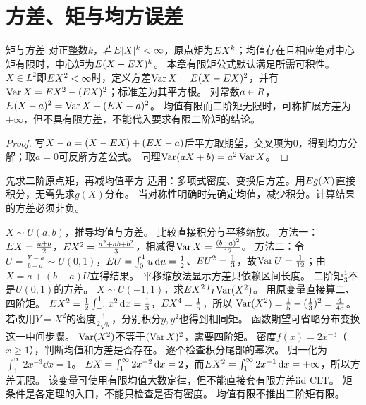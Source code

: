 \section{方差、矩与均方误差}\label{sec:42}
\begin{definition}{矩与方差}
对正整数$k$，若$E|X|^k<\infty$，原点矩为$E X^k$；均值存在且相应绝对中心矩有限时，中心矩为$E(X-E X)^k$。
本章有限矩公式默认满足所需可积性。$X\in L^2$即$E X^2<\infty$时，定义方差$\operatorname{Var} X=E(X-E X)^2$，并有$\operatorname{Var} X=E X^2-(E X)^2$；标准差为其平方根。
对常数$a\in R$，$E(X-a)^2=\operatorname{Var} X+(E X-a)^2$。
均值有限而二阶矩无限时，可称扩展方差为$+\infty$，但不具有限方差，不能代入要求有限二阶矩的结论。
\end{definition}
\begin{proof}
写$X-a=(X-E X)+(E X-a)$后平方取期望，交叉项为0，得到均方分解；取$a=0$可反解方差公式。
同理$\operatorname{Var}(aX+b)=a^2\operatorname{Var} X$。
\end{proof}
\begin{method}{先求二阶原点矩，再减均值平方}
适用：多项式密度、变换后方差。用$E g(X)$直接积分，无需先求$g(X)$分布。
当对称性明确时先确定均值，减少积分。计算结果的方差必须非负。
\end{method}
{$X\sim U(a,b)$，推导均值与方差。}
{比较直接积分与平移缩放。}
{方法一：$E X=\frac{a+b}{2}$，$E X^2=\frac{a^2+ab+b^2}{3}$，相减得$\operatorname{Var} X=\frac{(b-a)^2}{12}$。
方法二：令$U=\frac{X-a}{b-a}\sim U(0,1)$，$E U=\int_0^1u\,\mathrm d u=\frac{1}{2}$、$E U^2=\frac{1}{3}$，故$\operatorname{Var} U=\frac{1}{12}$；由$X=a+(b-a)U$立得结果。}
{平移缩放法显示方差只依赖区间长度。}
{二阶矩$\frac{1}{3}$不是$U(0,1)$的方差。}
{$X\sim U(-1,1)$，求$E X^2$与$\operatorname{Var}(X^2)$。}
{用原变量直接算二、四阶矩。}
{$E X^2=\frac12\int_{-1}^1x^2\,\mathrm d x=\frac{1}{3}$，$E X^4=\frac{1}{5}$，所以
$\operatorname{Var}(X^2)=\frac{1}{5}-(\frac{1}{3})^2=\frac{4}{45}$。
若改用$Y=X^2$的密度$\frac{1}{2\sqrt y}$，分别积分$y,y^2$也得到相同矩。}
{函数期望可省略分布变换这一中间步骤。}
{$\operatorname{Var}(X^2)$不等于$(\operatorname{Var} X)^2$，需要四阶矩。}
{密度$f(x)=2x^{-3}$（$x\ge1$），判断均值和方差是否存在。}
{逐个检查积分尾部的幂次。}
{归一化为$\int_1^\infty2x^{-3}\dd x=1$。
$E X=\int_1^\infty2x^{-2}\,\mathrm d x=2$，而$E X^2=\int_1^\infty2x^{-1}\,\mathrm d x=+\infty$，所以方差无限。
该变量可使用有限均值大数定律，但不能直接套有限方差iid CLT。}
{矩条件是各定理的入口，不能只检查是否有密度。}
{均值有限不推出二阶矩有限。}

